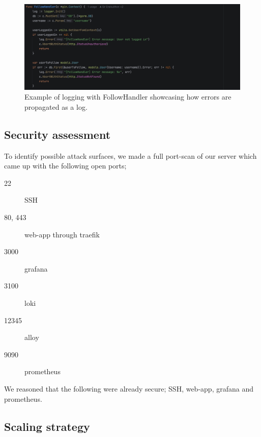 \begin{figure} [H]
    \centering
    \includegraphics[width=1\linewidth]{pictures/StdLog.png}
    \caption{Example of logging with FollowHandler showcasing how errors are propagated as a log.}
    \label{fig:enter-label}
\end{figure}


\subsection{Security assessment} %
To identify possible attack surfaces, we made a full port-scan of our server which came up with the following open ports;
\begin{description}
    \item[22] SSH
    \item[80, 443] web-app through traefik
    \item[3000] grafana
    \item[3100] loki
    \item[12345] alloy
    \item[9090] prometheus
\end{description}
We reasoned that the following were already secure; SSH, web-app, grafana and prometheus.
\subsection{Scaling strategy} %

